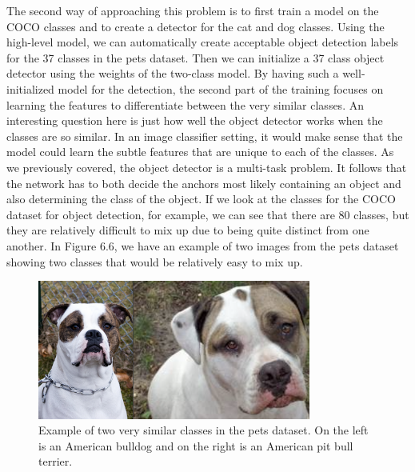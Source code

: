 The second way of approaching this problem is to first train a model on the COCO classes and to create a detector for the cat and dog classes.
Using the high-level model, we can automatically create acceptable object detection labels for the 37 classes in the pets dataset.
Then we can initialize a 37 class object detector using the weights of the two-class model.
By having such a well-initialized model for the detection, the second part of the training focuses on learning the features to differentiate between the very similar classes.
An interesting question here is just how well the object detector works when the classes are so similar.
In an image classifier setting, it would make sense that the model could learn the subtle features that are unique to each of the classes.
As we previously covered, the object detector is a multi-task problem. 
It follows that the network has to both decide the anchors most likely containing an object and also determining the class of the object.
If we look at the classes for the COCO dataset for object detection, for example, we can see that there are 80 classes, but they are relatively difficult to mix up due to being quite distinct from one another. 
In Figure 6.6, we have an example of two images from the pets dataset showing two classes that would be relatively easy to mix up.

\begin{figure}[h!] 
\centering 
\includegraphics[width=0.8\textwidth]{imgs/pets-example.png}
\caption{Example of two very similar classes in the pets dataset. On the left is an American bulldog and on the right is an American pit bull terrier.}
\end{figure}

